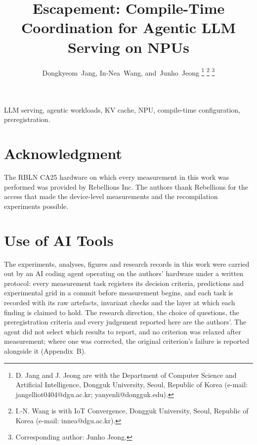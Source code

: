 \documentclass[journal]{IEEEtran}
\author{%
  Dongkyeom~Jang,
  In-Nea~Wang,
  and~Junho~Jeong%
  \thanks{D. Jang and J. Jeong are with the Department of Computer Science and
    Artificial Intelligence, Dongguk University, Seoul, Republic of Korea
    (e-mail: jangelliot0404@dgu.ac.kr; yanyenli@dongguk.edu).}%
  \thanks{I.-N. Wang is with IoT Convergence, Dongguk University, Seoul,
    Republic of Korea (e-mail: innea@dgu.ac.kr).}%
  \thanks{Corresponding author: Junho Jeong.}%
}
\title{Escapement: Compile-Time Coordination for Agentic LLM Serving on NPUs}
\begin{document}
\maketitle

\begin{abstract}

\end{abstract}

\begin{IEEEkeywords}
LLM serving, agentic workloads, KV cache, NPU, compile-time configuration,
preregistration.
\end{IEEEkeywords}












\appendices


\section*{Acknowledgment}
The RBLN CA25 hardware on which every measurement in this work was performed
was provided by Rebellions Inc. The authors thank Rebellions for the access
that made the device-level measurements and the recompilation experiments
possible.

\section*{Use of AI Tools}
The experiments, analyses, figures and research records in this work were
carried out by an AI coding agent operating on the authors' hardware under a
written protocol: every measurement task registers its decision criteria,
predictions and experimental grid in a commit before measurement begins, and
each task is recorded with its raw artefacts, invariant checks and the layer at
which each finding is claimed to hold. The research direction, the choice of
questions, the preregistration criteria and every judgement reported here are
the authors'. The agent did not select which results to report, and no
criterion was relaxed after measurement; where one was corrected, the original
criterion's failure is reported alongside it (Appendix~B).



\end{document}
